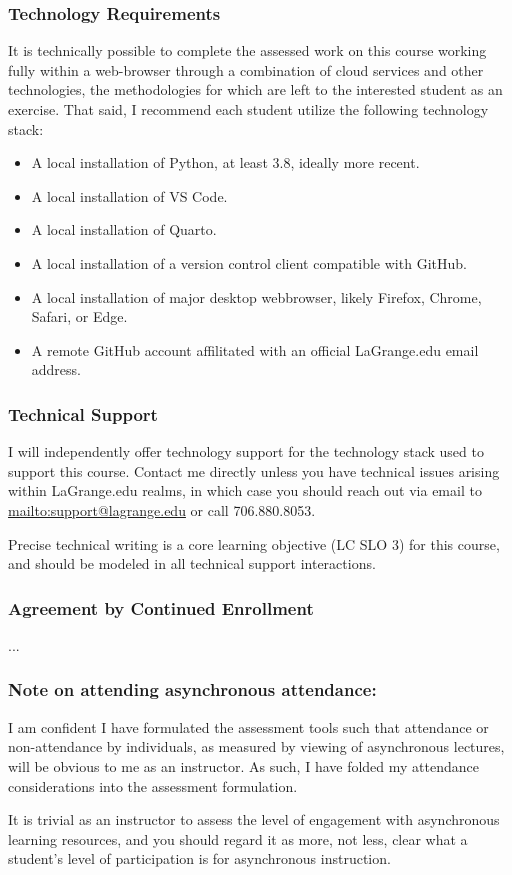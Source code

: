 \documentclass[11pt]{article}
\begin{document}
\subsubsection*{Technology Requirements}

It is technically possible to complete the assessed work on this course working fully within a web-browser through a combination of cloud services and other technologies, the methodologies for which are left to the interested student as an exercise. That said, I recommend each student utilize the following technology stack:

\begin{itemize}
\item A local installation of Python, at least 3.8, ideally more recent.
\item A local installation of VS Code.
\item A local installation of Quarto.
\item A local installation of a version control client compatible with GitHub.
\item A local installation of major desktop webbrowser, likely Firefox, Chrome, Safari, or Edge.
\item A remote GitHub account affilitated with an official LaGrange.edu email address.
\end{itemize}

\subsubsection*{Technical Support}

I will independently offer technology support for the technology stack used to support this course. Contact me directly unless you have technical issues arising within LaGrange.edu realms, in which case you should reach out via email to \href{support@lagrange.edu}{mailto:support@lagrange.edu} or call 706.880.8053.

\skip

Precise technical writing is a core learning objective (LC SLO 3) for this course, and should be modeled in all technical support interactions.

\subsubsection*{Agreement by Continued Enrollment}
...

\subsubsection*{Note on attending asynchronous attendance:}

I am confident I have formulated the assessment tools such that attendance or non-attendance by individuals, as measured by viewing of asynchronous lectures, will be obvious to me as an instructor. As such, I have folded my attendance considerations into the assessment formulation.

\skip

It is trivial as an instructor to assess the level of engagement with asynchronous learning resources, and you should regard it as more, not less, clear what a student's level of participation is for asynchronous instruction.
\end{document}
